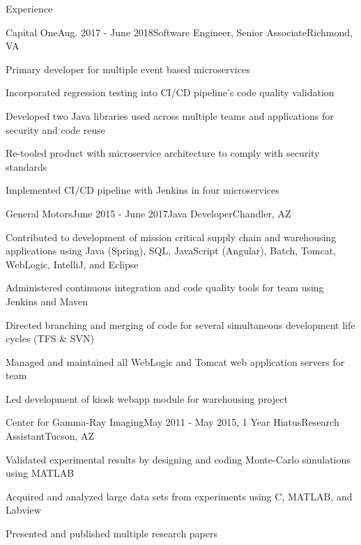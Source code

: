 \documentclass{resume} %
\begin{document}
\begin{rSection}{Experience}
	\begin{rSubsection}{Capital One}{Aug. 2017 - June 2018}{Software Engineer, Senior Associate}{Richmond, VA}
		\vspace{-0.5em}\setlength{\itemindent}{.0in}\item{
			Primary developer for multiple event based microservices
		}
		\item Incorporated regression testing into CI/CD pipeline's code quality validation
		\item Developed two Java libraries used across multiple teams and applications for security and code reuse
		\item Re-tooled product with microservice architecture to comply with security standards
		\item Implemented CI/CD pipeline with Jenkins in four microservices

	\end{rSubsection}

	\begin{rSubsection}{General Motors}{June 2015 - June 2017}{Java Developer}{Chandler, AZ}
		\vspace{-0.5em}\setlength{\itemindent}{.0in}\item {
			Contributed to development of mission critical supply chain and warehousing applications using
			\newline
			Java (Spring), SQL, JavaScript (Angular), Batch, Tomcat, WebLogic, IntelliJ, and Eclipse
		}
		\item Administered continuous integration and code quality tools for team using Jenkins and Maven
		\item Directed branching and merging of code for several simultaneous development life cycles (TFS \& SVN)
		\item Managed and maintained all WebLogic and Tomcat web application servers for team
		\item Led development of kiosk webapp module for warehousing project
	
	\end{rSubsection}


	\begin{rSubsection}{Center for Gamma-Ray Imaging}{May 2011 - May 2015, 1 Year Hiatus}{Research Assistant}{Tucson, AZ}
	\item Validated experimental results by designing and coding Monte-Carlo simulations using MATLAB
	\item Acquired and analyzed large data sets from experiments using C, MATLAB, and Labview
	\item Presented and published multiple research papers

	\end{rSubsection}

\end{rSection}
\end{document}

